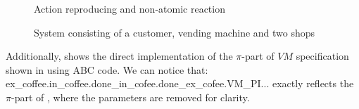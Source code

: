 \begin{figure}[H]%
\centering
{}%
\caption{Action reproducing and non-atomic reaction}
\label{non_atomic_reactoin}%
\end{figure}







\begin{figure}[H]%
\centering
{}%
\caption{System consisting of a customer, vending machine and two shops}
\label{sys_non_atomic_reactoin}%
\end{figure}

Additionally,  shows the direct implementation of the $\pi$-part of $VM$ specification shown in  using ABC code. We can notice that: \\
ex\_coffee.\textquotesingle in\_coffee.done\_in\_cofee.\textquotesingle done\_ex\_cofee.VM\_PI... exactly reflects the $\pi$-part of , where the parameters are removed for clarity.

